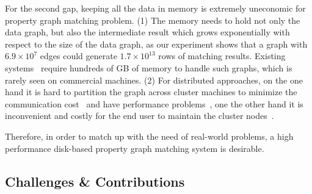 
For the second gap, keeping all the data in memory is extremely uneconomic for property graph matching problem.
(1) The memory needs to hold not only the data graph, but also the intermediate result which grows exponentially with respect to the size of the data graph, as our experiment shows that a graph with $6.9 \times 10^{7}$ edges could generate $1.7 \times 10^{13}$ rows of matching results.
Existing systems~\cite{DBLP:conf/sosp/TeixeiraFSSZA15,DBLP:conf/sigmod/DiasTGM019,DBLP:journals/pvldb/MhedhbiS19} require hundreds of GB of memory to handle such graphs, which is rarely seen on commercial machines.
(2) For distributed approaches, on the one hand it is hard to partition the graph across cluster machines to minimize the communication cost~\cite{DBLP:journals/im/LeskovecLDM09} and have performance problems~\cite{DBLP:conf/sigmod/KimLBHLKJ16},
one the other hand it is inconvenient and costly for the end user to maintain the cluster nodes~\cite{DBLP:conf/osdi/KyrolaBG12}.

Therefore, in order to match up with the need of real-world problems,
a high performance disk-based property graph matching system is desirable.
\subsection*{Challenges \& Contributions}
